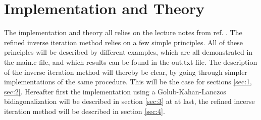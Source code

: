 \documentclass[twocolumn]{article}
\begin{document}
\section{\label{sec:0}Implementation and Theory}
The implementation and theory all relies on the lecture notes from ref. \cite[Chapter 12 - Eigenvalues 2: Power methods and Krylov subspace methods]{Dmi}. The refined inverse iteration method relies on a few simple principles. All of these principles will be described by different examples, which are all demonstrated in the main.c file, and which results can be found in the out.txt file. The description of the inverse iteration method will thereby be clear, by going through simpler implementations of the same procedure. This will be the case for sections \ref{sec:1, sec:2}. Hereafter first the implementation using a Golub-Kahan-Lanczos bidiagonalization will be described in section \ref{sec:3} at at last, the refined incerse iteration method will be described in section \ref{sec:4}.  
\end{document}
